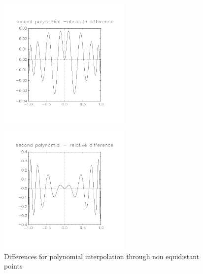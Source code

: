 \documentclass[11pt, a4paper, titlepage, openright]{article}
\begin{document}
    \begin{figure}[H]
        \begin{minipage}[b]{0.49\textwidth}
            \includegraphics[width=6.5cm, trim={2cm, 4cm, 2cm, 3cm}, clip]{../images/diff2abs}
        \end{minipage}
        \hfill
        \begin{minipage}[b]{0.49\textwidth}
            \includegraphics[width=6.5cm, trim={2cm, 4cm, 2cm, 3cm}, clip]{../images/diff2rel}
        \end{minipage}
        \caption{Differences for polynomial interpolation through non equidistant points}
        \label{fig:diff2}
    \end{figure}
\end{document}
